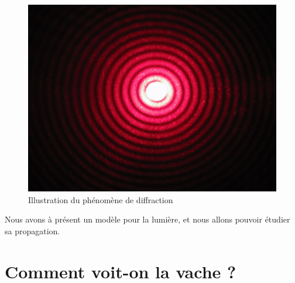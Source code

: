 \documentclass{classe}
\begin{document}
\begin{figure}[H]
	\centering
	\includegraphics[scale=.08]{Diffraction.jpeg}
	\caption{Illustration du phénomène de diffraction}
\end{figure}
Nous avons à présent un modèle pour la lumière, et nous allons pouvoir étudier sa propagation.

\section{Comment voit-on la vache ?}
\end{document}
